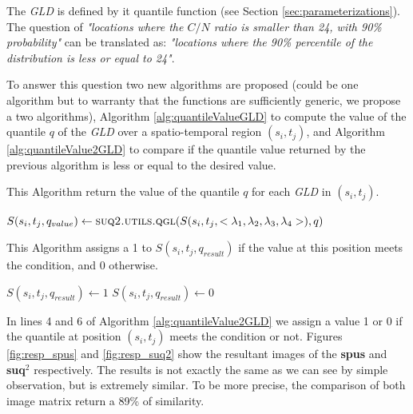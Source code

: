 The \textit{GLD} is defined by it quantile function (see Section \ref{sec:parameterizations}). The question of \textit{"locations where the $C/N$ ratio is smaller than 24, with 90\% probability"} can be translated as: \textit{"locations where the 90\% percentile of the distribution is less or equal to 24"}. 

To answer this question two new algorithms are proposed (could be one algorithm but to warranty that the functions are sufficiently generic, we propose a two algorithms), Algorithm \ref{alg:quantileValueGLD} to compute the value of the quantile $q$ of the \textit{GLD} over a spatio-temporal region $(s_{i},t_{j})$, and Algorithm \ref{alg:quantileValue2GLD} to compare if the quantile value returned by the previous algorithm is less or equal to the desired value.

\begin{algorithm} 
\caption{This Algorithm return the value of the quantile $q$ for each \textit{GLD} in $(s_{i},t_{j})$.}\label{alg:quantileValueGLD}
\begin{algorithmic}[1] 
\State $S(s_{i},t_{j}, q_{value}) \gets \Call {suq2.utils.qgl}{S(s_{i},t_{j}, <\lambda_{1},\lambda_{2},\lambda_{3},\lambda_{4}>), q}$
\EndFor
\EndFunction 
\end{algorithmic} 
\end{algorithm} 

\begin{algorithm} 
\caption{This Algorithm assigns a 1 to $S(s_{i},t_{j}, q_{result})$ if the value at this position meets the condition, and 0 otherwise.}\label{alg:quantileValue2GLD}
\begin{algorithmic}[1] 
\State $S(s_{i},t_{j}, q_{result}) \gets 1$
\Else
\State $S(s_{i},t_{j}, q_{result}) \gets 0$
\EndIf
\EndFor
\EndFunction 
\end{algorithmic} 
\end{algorithm} 

In lines 4 and 6 of Algorithm \ref{alg:quantileValue2GLD} we assign a value 1 or 0 if the quantile at position $(s_{i},t_{j})$ meets the condition or not. Figures \ref{fig:resp_spus} and \ref{fig:resp_suq2} show the resultant images of the \textbf{spus} and \textbf{suq$^2$} respectively. The results is not exactly the same as we can see by simple observation, but is extremely similar. To be more precise, the comparison of both image matrix return a 89\% of similarity.

